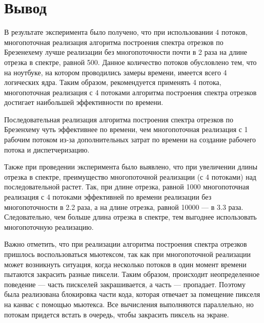 \clearpage
\FloatBarrier

\section*{Вывод}
В результате эксперимента было получено, что при использовании 4 потоков, многопоточная реализация алгоритма построения спектра отрезков по Брезенехему лучше реализации без многопоточности почти в 2 раза на длине отрезка в спектре, равной 500. Данное количество потоков обусловлено тем, что на ноутбуке, на котором проводились замеры времени, имеется всего 4 логических ядра. Таким образом, рекомендуется применять 4 потока, многопоточная реализация с 4 потоками алгоритма построения спектра отрезков достигает наибольшей эффективности по времени.

Последовательная реализация алгоритма построения спектра отрезков по Брезенхему чуть эффективнее по времени, чем многопоточная реализация с 1 рабочим потоком из-за дополнительных затрат по времени на создание рабочего потока и диспетчеризацию.

Также при проведении эксперимента было выявлено, что при увеличении длины отрезка в спектре, преимущество многопоточной реализации (с 4 потоками) над последовательной растет. Так, при длине отрезка, равной 1000 многопоточная реализация с 4 потоками эффективней по времени реализации без многопоточности в 2.2 раза, а на длине отрезка, равной 10000 --- в 3.3 раза. Следовательно, чем больше длина отрезка в спектре, тем выгоднее использовать многопоточную реализацию.

Важно отметить, что при реализации алгоритма построения спектра отрезков пришлось воспользоваться мьютексом, так как при многопоточной реализации может возникнуть ситуация, когда несколько потоков в один момент времени пытаются закрасить разные пиксели. Таким образом, происходит неопределенное поведение --- часть пискселей закрашивается, а часть --- пропадает. Поэтому была реализована блокировка части кода, которая отвечает за помещение пикселя на канвас с помощью мьютекса. Все вычисления выполняются параллельно, но потокам придется встать в очередь, чтобы закрасить пиксель на экране.